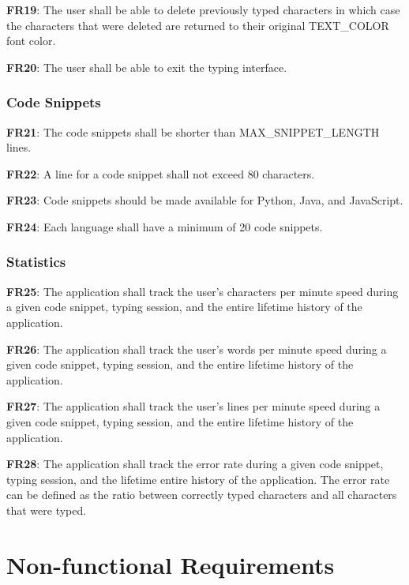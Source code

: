 \documentclass[12pt, titlepage]{article}
\begin{document}
\noindent \textbf{FR19}: The user shall be able to delete previously typed characters in which case the characters that were deleted are returned to their original TEXT\_COLOR font color.

\noindent \textbf{FR20}: The user shall be able to exit the typing interface.

\subsubsection{Code Snippets}
\noindent \textbf{FR21}: The code snippets shall be shorter than MAX\_SNIPPET\_LENGTH lines.

\noindent \textbf{FR22}: A line for a code snippet shall not exceed 80 characters.

\noindent \textbf{FR23}: Code snippets should be made available for Python, Java, and JavaScript.

\noindent \textbf{FR24}: Each language shall have a minimum of 20 code snippets.

\subsubsection{Statistics}

\noindent \textbf{FR25}: The application shall track the user's characters per minute speed during a given code snippet, typing session, and the entire lifetime history of the application.

\noindent \textbf{FR26}: The application shall track the user's words per minute speed during a given code snippet, typing session, and the entire lifetime history of the application.

\noindent \textbf{FR27}: The application shall track the user's lines per minute speed during a given code snippet, typing session, and the entire lifetime history of the application.

\noindent \textbf{FR28}: The application shall track the error rate during a given code snippet, typing session, and the lifetime entire history of the application. The error rate can be defined as the ratio between correctly typed characters and all characters that were typed.



\section{Non-functional Requirements}
\end{document}
